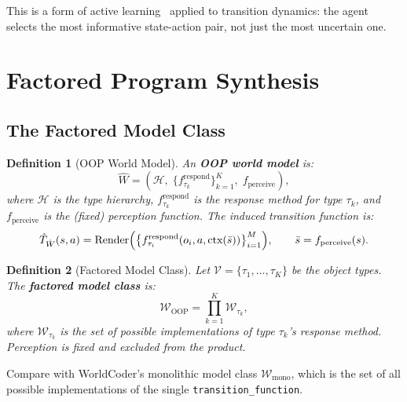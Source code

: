 \documentclass{article}
\newtheorem{definition}{Definition}
\newcommand{\calH}{\mathcal{H}}
\newcommand{\calV}{\mathcal{V}}
\newcommand{\calW}{\mathcal{W}}
\begin{document}
This is a form of active learning~\cite{settles2009active} applied to
transition dynamics: the agent selects the most informative state-action
pair, not just the most uncertain one.



\section{Factored Program Synthesis}
\label{sec:synthesis}

\subsection{The Factored Model Class}
\label{sec:factored}

\begin{definition}[OOP World Model]
\label{def:oop_world_model}
An \textbf{OOP world model} is:
\begin{equation}
    \hat{W} = (\calH, \; \{f_{\tau_k}^{\text{respond}}\}_{k=1}^K, \;
               f_{\text{perceive}}),
\end{equation}
where $\calH$ is the type hierarchy, $f_{\tau_k}^{\text{respond}}$ is the
response method for type $\tau_k$, and $f_{\text{perceive}}$ is the (fixed)
perception function.  The induced transition function is:
\begin{equation}
    \hat{T}_{\hat{W}}(s, a) = \text{Render}\Bigl(
        \bigl\{f_{\tau_i}^{\text{respond}}(o_i, a, \text{ctx}(\bar{s}))
        \bigr\}_{i=1}^M \Bigr),
    \qquad \bar{s} = f_{\text{perceive}}(s).
\end{equation}
\end{definition}

\begin{definition}[Factored Model Class]
\label{def:factored_class}
Let $\calV = \{\tau_1, \ldots, \tau_K\}$ be the object types.  The
\textbf{factored model class} is:
\begin{equation}
    \calW_{\text{OOP}} = \prod_{k=1}^{K} \calW_{\tau_k},
\end{equation}
where $\calW_{\tau_k}$ is the set of possible implementations of type $\tau_k$'s
response method.  Perception is fixed and excluded from the product.
\end{definition}

Compare with WorldCoder's monolithic model class $\calW_{\text{mono}}$, which
is the set of all possible implementations of the single
\texttt{transition\_function}.
\end{document}
